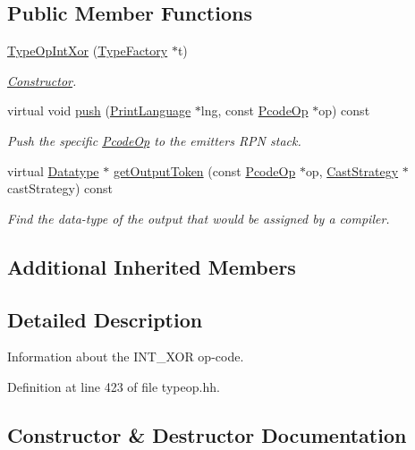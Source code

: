 \subsection*{Public Member Functions}
\begin{DoxyCompactItemize}
\item 
\mbox{\hyperlink{class_type_op_int_xor_a6cfd354b030c13f12b371c7f40a383b6}{Type\+Op\+Int\+Xor}} (\mbox{\hyperlink{class_type_factory}{Type\+Factory}} $\ast$t)
\begin{DoxyCompactList}\small\item\em \mbox{\hyperlink{class_constructor}{Constructor}}. \end{DoxyCompactList}\item 
virtual void \mbox{\hyperlink{class_type_op_int_xor_a8ee9baa6e405df5fd4fe9e6a5b4ccf34}{push}} (\mbox{\hyperlink{class_print_language}{Print\+Language}} $\ast$lng, const \mbox{\hyperlink{class_pcode_op}{Pcode\+Op}} $\ast$op) const
\begin{DoxyCompactList}\small\item\em Push the specific \mbox{\hyperlink{class_pcode_op}{Pcode\+Op}} to the emitter\textquotesingle{}s R\+PN stack. \end{DoxyCompactList}\item 
virtual \mbox{\hyperlink{class_datatype}{Datatype}} $\ast$ \mbox{\hyperlink{class_type_op_int_xor_aecfecb807f0b493995187353fc89b14b}{get\+Output\+Token}} (const \mbox{\hyperlink{class_pcode_op}{Pcode\+Op}} $\ast$op, \mbox{\hyperlink{class_cast_strategy}{Cast\+Strategy}} $\ast$cast\+Strategy) const
\begin{DoxyCompactList}\small\item\em Find the data-\/type of the output that would be assigned by a compiler. \end{DoxyCompactList}\end{DoxyCompactItemize}
\subsection*{Additional Inherited Members}


\subsection{Detailed Description}
Information about the I\+N\+T\+\_\+\+X\+OR op-\/code. 

Definition at line 423 of file typeop.\+hh.



\subsection{Constructor \& Destructor Documentation}
\mbox{\label{class_type_op_int_xor_a6cfd354b030c13f12b371c7f40a383b6}} 
